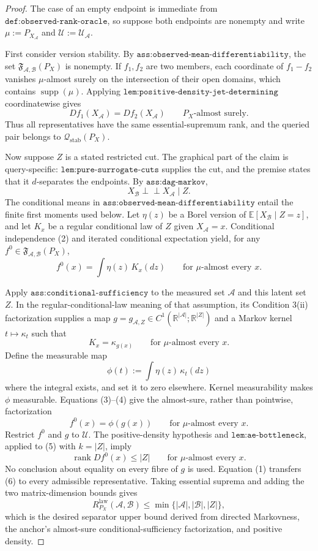 \documentclass{article}
\begin{document}
\begin{proof}
The case of an empty endpoint is immediate from \(\texttt{def:observed-rank-oracle}\), so suppose both endpoints are nonempty and write \(\mu:=P_{X_{\mathcal A}}\) and \(\mathcal U:=\mathcal U_{\mathcal A}\).

First consider version stability.  By \(\texttt{ass:observed-mean-differentiability}\), the set \(\mathfrak F_{\mathcal A,\mathcal B}(P_X)\) is nonempty.  If \(f_1,f_2\) are two members, each coordinate of \(f_1-f_2\) vanishes \(\mu\)-almost surely on the intersection of their open domains, which contains \(\operatorname{supp}(\mu)\).  Applying \(\texttt{lem:positive-density-jet-determining}\) coordinatewise gives
\[
 Df_1(X_{\mathcal A})=Df_2(X_{\mathcal A})
 \qquad P_X\text{-almost surely}. \tag{1}
\]
Thus all representatives have the same essential-supremum rank, and the queried pair belongs to \(\mathcal Q_{\mathrm{stab}}(P_X)\).

Now suppose \(Z\) is a stated restricted cut.  The graphical part of the claim is query-specific: \(\texttt{lem:pure-surrogate-cuts}\) supplies the cut, and the premise states that it \(d\)-separates the endpoints.  By \(\texttt{ass:dag-markov}\),
\[
 X_{\mathcal B}\mathbin{\perp\!\!\!\perp}X_{\mathcal A}\mid Z. \tag{2}
\]
The conditional means in \(\texttt{ass:observed-mean-differentiability}\) entail the finite first moments used below.  Let \(\eta(z)\) be a Borel version of \(\mathbb E[X_{\mathcal B}\mid Z=z]\), and let \(K_x\) be a regular conditional law of \(Z\) given \(X_{\mathcal A}=x\).  Conditional independence (2) and iterated conditional expectation yield, for any \(f^0\in\mathfrak F_{\mathcal A,\mathcal B}(P_X)\),
\[
 f^0(x)=\int\eta(z)\,K_x(dz)
 \qquad\text{for }\mu\text{-almost every }x. \tag{3}
\]

Apply \(\texttt{ass:conditional-sufficiency}\) to the measured set \(\mathcal A\) and this latent set \(Z\).  In the regular-conditional-law meaning of that assumption, its Condition 3(ii) factorization supplies a map \(g=g_{\mathcal A,Z}\in C^1(\mathbb R^{|\mathcal A|};\mathbb R^{|Z|})\) and a Markov kernel \(t\mapsto\kappa_t\) such that
\[
 K_x=\kappa_{g(x)}
 \qquad\text{for }\mu\text{-almost every }x. \tag{4}
\]
Define the measurable map
\[
 \phi(t):=\int\eta(z)\,\kappa_t(dz)
\]
where the integral exists, and set it to zero elsewhere.  Kernel measurability makes \(\phi\) measurable.  Equations (3)--(4) give the almost-sure, rather than pointwise, factorization
\[
 f^0(x)=\phi(g(x))
 \qquad\text{for }\mu\text{-almost every }x. \tag{5}
\]
Restrict \(f^0\) and \(g\) to \(\mathcal U\).  The positive-density hypothesis and \(\texttt{lem:ae-bottleneck}\), applied to (5) with \(k=|Z|\), imply
\[
 \operatorname{rank}Df^0(x)\leq |Z|
 \qquad\text{for }\mu\text{-almost every }x. \tag{6}
\]
No conclusion about equality on every fibre of \(g\) is used.  Equation (1) transfers (6) to every admissible representative.  Taking essential suprema and adding the two matrix-dimension bounds gives
\[
 R^{\mathrm{law}}_{P_X}(\mathcal A,\mathcal B)
 \leq\min\{|\mathcal A|,|\mathcal B|,|Z|\},
\]
which is the desired separator upper bound derived from directed Markovness, the anchor's almost-sure conditional-sufficiency factorization, and positive density.
\end{proof}
\end{document}
